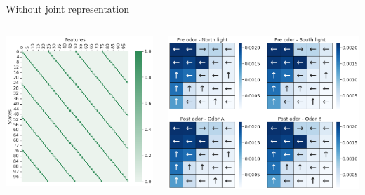 \documentclass[bigger]{beamer}
\begin{document}
\begin{frame}[label={sec:org02350da}]{Without joint representation}
\begin{columns}
\begin{column}{0.5\columnwidth}
\begin{center}
\includegraphics[height=0.4\textheight]{img/features-allo-no-joint-repr.png}
\end{center}
\end{column}
\begin{column}{0.5\columnwidth}
\begin{center}
\includegraphics[width=\textwidth]{img/policy-allo-no-joint-repr.png}

\end{center}
\end{column}
\end{columns}
\end{frame}
\end{document}
